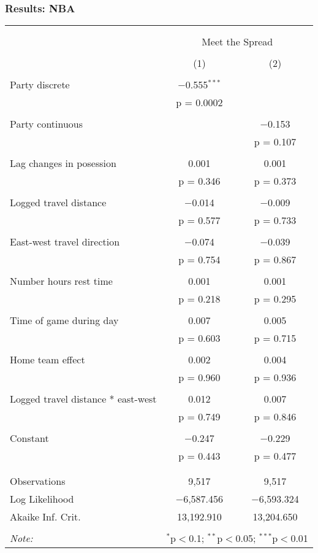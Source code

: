 \documentclass{beamer}
\begin{document}
\begin{frame}   \frametitle{Results: NBA}
  \vspace{-2pt}
  \centering
  \tiny{ %
\begin{tabular}{@{\extracolsep{5pt}}lcc}  \\[-1.8ex]\hline  \hline \\  \cline{2-3}  \\[-1.8ex] & \multicolumn{2}{c}{Meet the Spread} \\  \\[-1.8ex] & (1) & (2)\\  \hline \\[-1.8ex]   Party discrete & $-$0.555$^{***}$ &  \\    & p = 0.0002 &  \\    & & \\   Party continuous &  & $-$0.153 \\    &  & p = 0.107 \\    & & \\   Lag changes in posession & 0.001 & 0.001 \\    & p = 0.346 & p = 0.373 \\    & & \\   Logged travel distance & $-$0.014 & $-$0.009 \\    & p = 0.577 & p = 0.733 \\    & & \\   East-west travel direction & $-$0.074 & $-$0.039 \\    & p = 0.754 & p = 0.867 \\    & & \\   Number hours rest time & 0.001 & 0.001 \\    & p = 0.218 & p = 0.295 \\    & & \\   Time of game during day & 0.007 & 0.005 \\    & p = 0.603 & p = 0.715 \\    & & \\   Home team effect & 0.002 & 0.004 \\    & p = 0.960 & p = 0.936 \\    & & \\   Logged travel distance * east-west & 0.012 & 0.007 \\    & p = 0.749 & p = 0.846 \\    & & \\   Constant & $-$0.247 & $-$0.229 \\    & p = 0.443 & p = 0.477 \\    & & \\  \hline \\[-1.8ex]  Observations & 9,517 & 9,517 \\  Log Likelihood & $-$6,587.456 & $-$6,593.324 \\  Akaike Inf. Crit. & 13,192.910 & 13,204.650 \\  \hline  \hline \\[-1.8ex]  \textit{Note:}  & \multicolumn{2}{r}{$^{*}$p$<$0.1; $^{**}$p$<$0.05; $^{***}$p$<$0.01} \\  \end{tabular}    }   
\end{frame}
\end{document}
